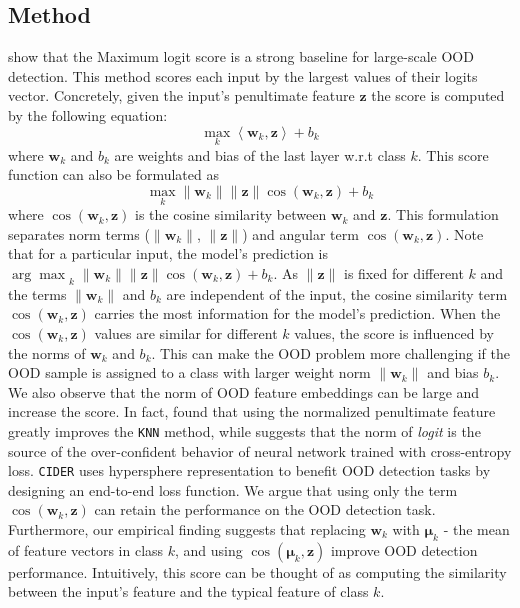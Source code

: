 \documentclass[nohyperref]{article}
\theoremstyle{plain}
\theoremstyle{definition}
\theoremstyle{remark}
\begin{document}
\subsection{Method}
\label{sec:Motivation}
\citet{hendrycks2022scaling} show that the Maximum logit score is a strong baseline for large-scale OOD detection.
This method scores each input by the largest values of their logits vector. 
Concretely, given the input's penultimate feature $\mathbf{z}$ the score is computed by the following equation: 
\begin{equation*}
    \underset{k}{\max} \left<\mathbf{w}_k, \mathbf{z}\right> + b_k
\end{equation*}
where $\mathbf{w}_k$ and $b_k$ are weights and bias of the last layer w.r.t class $k$. 
This score function can also be formulated as 
\begin{equation*}
    \max_k \|\mathbf{w}_k\|\|\mathbf{z}\|\cos (\mathbf{w}_k, \mathbf{z}) + b_k
\end{equation*}
where $\cos (\mathbf{w}_k, \mathbf{z}) $ is the cosine similarity between $\mathbf{w}_k$ and $\mathbf{z}$.
This formulation separates norm terms ($\|\mathbf{w}_k\|$, $\|\mathbf{z}\|$) and angular term $\cos (\mathbf{w}_k, \mathbf{z}) $. 
Note that for a particular input, the model's prediction is ${\arg\max}_k \;\|\mathbf{w}_k\|\|\mathbf{z}\|\cos (\mathbf{w}_k, \mathbf{z}) + b_k. $
As $\|\mathbf{z}\|$ is fixed for different $k$ and the terms $\|\mathbf{w}_k\|$ and $b_k$ are independent of the input, the cosine similarity term $\cos (\mathbf{w}_k, \mathbf{z})$ carries the most information for the model's prediction. When the $\cos (\mathbf{w}_k, \mathbf{z}) $ values are similar for different $k$ values, the score is influenced by the norms of $\mathbf{w}_k$ and $b_k$. 
This can make the OOD problem more challenging if the OOD sample is assigned to a class with larger weight norm $\|\mathbf{w}_k\|$ and bias $b_k$.
We also observe that the norm of OOD feature embeddings can be large and increase the score.
In fact, \citet{sun2022knn} found that using the normalized penultimate feature greatly improves the \texttt{KNN} method, while
\citet{wei2022logitnorm} suggests that the norm of \textit{logit} is the source of the over-confident behavior of neural network trained with cross-entropy loss. 
\texttt{CIDER} \cite{ming2023how} uses hypersphere representation to benefit OOD detection tasks by designing an end-to-end loss function.
We argue that using only the term $\cos (\mathbf{w}_k, \mathbf{z})$ can retain the performance on the OOD detection task. 
Furthermore, our empirical finding suggests that replacing $\mathbf{w}_k$ with $\boldsymbol{\mu}_k$ - the mean of feature vectors in class $k$, and using $\cos(\boldsymbol{\mu}_k, \mathbf{z})$ improve OOD detection performance. Intuitively, this score can be thought of as computing the similarity between the input's feature and the typical feature of class $k$.  
\end{document}
